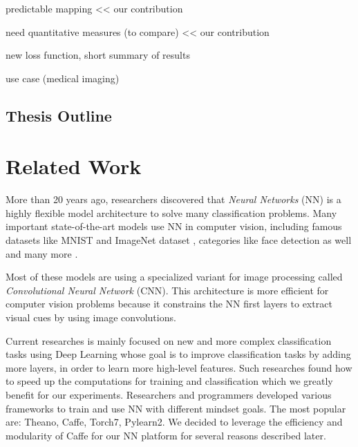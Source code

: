 \documentclass[a4paper,12pt]{report}
\begin{document}
predictable mapping << our contribution

need quantitative measures (to compare) << our contribution

new loss function, short summary of results

use case (medical imaging)

\section{Thesis Outline}


\chapter{Related Work}

More than 20 years ago, researchers discovered that {\em Neural Networks} (NN) is a highly flexible model architecture to solve many classification problems.
Many important state-of-the-art models use NN in computer vision, including famous datasets like MNIST \cite{mnist_web} and ImageNet dataset \cite{krizhevsky2012imagenet}, categories like face detection as well \cite{rowley1998neural} and many more \cite{prechelt1994proben1}.

Most of these models are using a specialized variant for image processing called {\em Convolutional Neural Network} (CNN).
This architecture is more efficient for computer vision problems because it constrains the NN first layers to extract visual cues by using image convolutions.

Current researches is mainly focused on new and more complex classification tasks using Deep Learning whose goal is to improve classification tasks by adding more layers, in order to learn more high-level features.
Such researches found how to speed up the computations for training and classification which we greatly benefit for our experiments\cite{ciresan2011flexible}.
Researchers and programmers developed various frameworks to train and use NN with different mindset goals.
The most popular are: Theano\cite{bastien2012theano}, Caffe\cite{jia2014caffe}, Torch7\cite{collobert2011torch7}, Pylearn2\cite{goodfellow2013pylearn2}.
We decided to leverage the efficiency and modularity of Caffe for our NN platform for several reasons described later.
\end{document}
